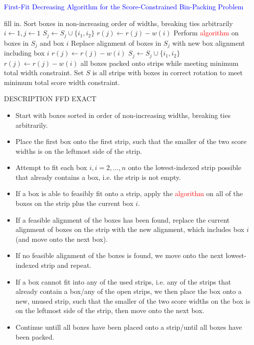\documentclass[oribibl]{llncs}
\begin{document}
\begin{algorithm}[H]
	\caption{\textcolor{blue}{First-Fit Decreasing Algorithm for the Score-Constrained Bin-Packing Problem}}
	\label{alg:ffdexact}
	\begin{algorithmic}[1]
	\Require fill in.   
	\State Sort boxes in non-increasing order of widths, breaking ties arbitrarily
	\State $i \gets 1, j \gets 1$
	\State $S_j \gets S_j \cup \{i_1, i_2\}$
	\State $r(j) \gets r(j) - w(i)$
				\State Perform \textcolor{red}{algorithm} on boxes in $S_j$ and box $i$
					\State Replace alignment of boxes in $S_j$ with new box alignment including box $i$
					\State $r(j) \gets r(j) - w(i)$
					\State \Break
				\EndIf
				\State $S_j \gets S_j \cup \{i_1, i_2\}$
				\State $r(j) \gets r(j) - w(i)$
				\State \Break
			\EndIf
		\EndFor
	\EndFor		
	\Ensure all boxes packed onto strips while meeting minimum total width constraint. Set $S$ is all strips with boxes in correct rotation to meet minimum total score width constraint.	
	\end{algorithmic}	
\end{algorithm}

DESCRIPTION FFD EXACT
\begin{itemize}
	\item Start with boxes sorted in order of non-increasing widths, breaking ties arbitrarily.
	\item Place the first box onto the first strip, such that the smaller of the two score widths is on the leftmost side of the strip.
	\item Attempt to fit each box $i, i = 2,..., n$ onto the lowest-indexed strip possible that already contains a box, i.e. the strip is not empty.
	\item If a box is able to feasibly fit onto a strip, apply the \textcolor{red}{algorithm} on all of the boxes on the strip plus the current box $i$.
	\item If a feasible alignment of the boxes has been found, replace the current alignment of boxes on the strip with the new alignment, which includes box $i$ (and move onto the next box).
	\item If no feasible alignment of the boxes is found, we move onto the next lowest-indexed strip and repeat.
	\item If a box cannot fit into any of the used strips, i.e. any of the strips that already contain a box/any of the open strips, we then place the box onto a new, unused strip, such that the smaller of the two score widths on the box is on the leftmost side of the strip, then move onto the next box.
	\item Continue untill all boxes have been placed onto a strip/until all boxes have been packed.
\end{itemize}
\end{document}
